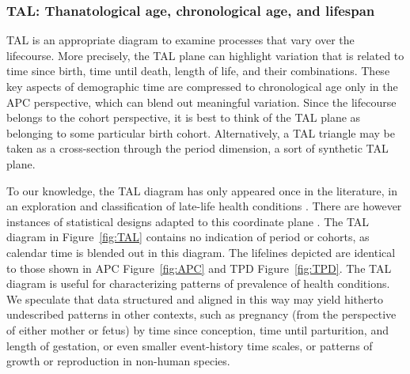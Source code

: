 \documentclass[12pt,oneside,a4paper]{article} %
\theoremstyle{definition}
\newcommand\tgh[1]{\raisebox{-.25\height}{\texttt{[image: Figures/triadtable/triad\#1.pdf]}}}
\begin{document}

\FloatBarrier
\subsubsection{TAL: Thanatological age, chronological age, and
lifespan}%
\label{sec:tal}
\FloatBarrier  
TAL is an appropriate diagram to examine processes that vary over the
lifecourse.
More precisely, the TAL plane can highlight variation that is related to time
since birth, time until death, length of life, and their combinations. These
key aspects of demographic time are compressed to chronological age only in the
APC perspective, which can blend out meaningful variation. Since the lifecourse belongs to the cohort perspective, it is best to think of the TAL plane as belonging to some particular birth cohort. Alternatively, a TAL triangle may be taken as a cross-section through the period dimension, a sort of synthetic TAL plane. 

To our knowledge, the TAL diagram has only appeared once in the literature, in an exploration and classification of late-life health
conditions \citep{riffe2015ttd}. There are however instances of statistical
designs adapted to this coordinate plane \citep[see e.g.,][]{Jewell2016,
dempsey2016}. The TAL diagram in Figure~\ref{fig:TAL} contains no indication of
period or cohorts, as calendar time is blended out in this diagram.
The lifelines depicted are identical to those shown in APC Figure~\ref{fig:APC}
and TPD Figure~\ref{fig:TPD}. The TAL diagram is useful for characterizing patterns of prevalence of health conditions. We speculate
that data structured and aligned in this way may yield hitherto undescribed
patterns in other contexts, such as pregnancy (from the perspective of either
mother or fetus) by time since conception, time until parturition, and length of
gestation, or even smaller event-history time scales, or patterns of growth or reproduction in non-human species.
\end{document}
